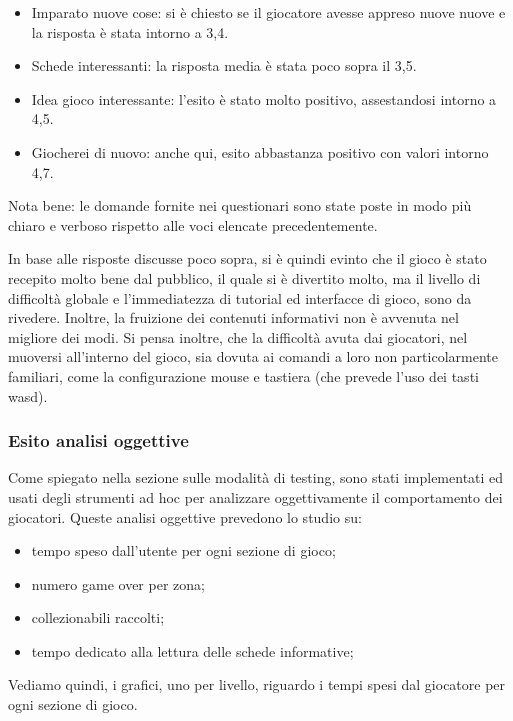 \begin{itemize}
\item Imparato nuove cose: si è chiesto se il giocatore avesse appreso nuove nuove e la risposta è stata intorno a 3,4.
\item Schede interessanti: la risposta media è stata poco sopra il 3,5.
\item Idea gioco interessante: l'esito è stato molto positivo, assestandosi intorno a 4,5.
\item Giocherei di nuovo: anche qui, esito abbastanza positivo con valori intorno 4,7.

\end{itemize}

Nota bene: le domande fornite nei questionari sono state poste in modo più chiaro e verboso rispetto alle voci elencate precedentemente.

In base alle risposte discusse poco sopra, si è quindi evinto che il gioco è stato recepito molto bene dal pubblico, il quale si è divertito molto, ma il livello di difficoltà globale e l'immediatezza di tutorial ed interfacce di gioco, sono da rivedere. Inoltre, la fruizione dei contenuti informativi non è avvenuta nel migliore dei modi.
Si pensa inoltre, che la difficoltà avuta dai giocatori, nel muoversi all'interno del gioco, sia dovuta ai comandi a loro non particolarmente familiari, come la configurazione mouse e tastiera (che prevede l'uso dei tasti wasd).

\subsubsection{Esito analisi oggettive}

Come spiegato nella sezione sulle modalità di testing, sono stati implementati ed usati degli strumenti ad hoc per analizzare oggettivamente il comportamento dei giocatori.
Queste analisi oggettive prevedono lo studio su:

\begin{itemize}

\item tempo speso dall'utente per ogni sezione di gioco;
\item numero game over per zona;
\item collezionabili raccolti;
\item tempo dedicato alla lettura delle schede informative;

\end {itemize}

Vediamo quindi, i grafici, uno per livello, riguardo i tempi spesi dal giocatore per ogni sezione di gioco.

